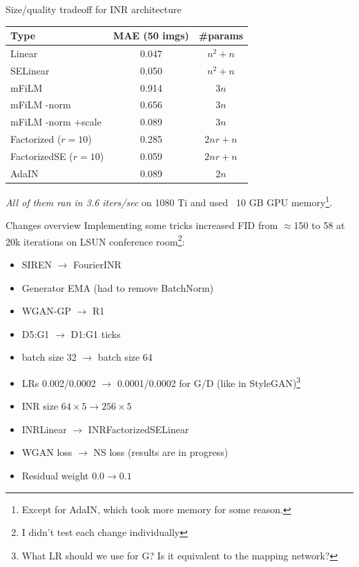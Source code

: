 \documentclass[10pt]{beamer}
\begin{document}
\begin{frame}{Size/quality tradeoff for INR architecture}
\begin{table}[]
\begin{tabular}{|l|c|c|}
\hline
Type & MAE (50 imgs) & \#params \\ \hline
Linear & 0.047 & $n^2 + n$ \\
SELinear & 0.050 & $n^2 + n$ \\
mFiLM & 0.914 & $3n$ \\
mFiLM -norm & 0.656 & $3n$ \\
mFiLM -norm +scale & 0.089 & $3n$ \\
Factorized ($r=10$) & 0.285 & $2nr + n$ \\
FactorizedSE ($r=10$) & 0.059 & $2nr + n$ \\
AdaIN & 0.089 & $2n$ \\ \hline
\end{tabular}
\end{table}
\textit{All of them ran in 3.6 iters/sec} on 1080 Ti and used ~10 GB GPU memory\footnote{Except for AdaIN, which took more memory for some reason.}.
\end{frame}


\begin{frame}{Changes overview}
Implementing some tricks increased FID from $\approx$150 to 58 at 20k iterations on LSUN conference room\footnote{I didn't test each change individually}:
\begin{itemize}
    \item\pause SIREN $\to$ FourierINR
    \item\pause Generator EMA (had to remove BatchNorm)
    \item\pause WGAN-GP $\to$ R1
    \item\pause D5:G1 $\to$ D1:G1 ticks
    \item\pause batch size 32 $\to$ batch size 64 
    \item\pause LRs 0.002/0.0002 $\to$ 0.0001/0.0002 for G/D (like in StyleGAN)\footnote{What LR should we use for G? Is it equivalent to the mapping network?}
    \item\pause INR size $64 \times 5 \to 256 \times 5$
    \item\pause INRLinear $\to$ INRFactorizedSELinear
    \item\pause WGAN loss $\to$ NS loss (results are in progress)
    \item\pause Residual weight $0.0 \to 0.1$
\end{itemize}
\end{frame}
\end{document}
